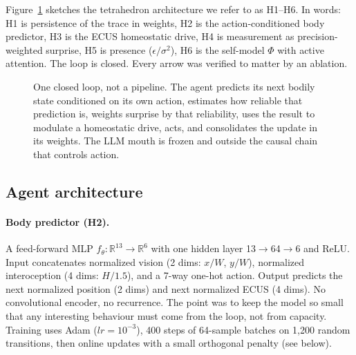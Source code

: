 \documentclass[11pt,a4paper]{article}
\begin{document}
Figure~\ref{fig:tetra} sketches the tetrahedron architecture we refer to as H1--H6. In words: H1 is persistence of the trace in weights, H2 is the action-conditioned body predictor, H3 is the ECUS homeostatic drive, H4 is measurement as precision-weighted surprise, H5 is presence ($\epsilon/\sigma^2$), H6 is the self-model $\Phi$ with active attention. The loop is closed. Every arrow was verified to matter by an ablation.

\begin{figure}[h]
\centering
{}
\caption{One closed loop, not a pipeline. The agent predicts its next bodily state conditioned on its own action, estimates how reliable that prediction is, weights surprise by that reliability, uses the result to modulate a homeostatic drive, acts, and consolidates the update in its weights. The LLM mouth is frozen and outside the causal chain that controls action.}
\label{fig:tetra}
\end{figure}

\subsection{Agent architecture}

\paragraph{Body predictor (H2).} A feed-forward MLP $f_\theta: \mathbb{R}^{13} \rightarrow \mathbb{R}^{6}$ with one hidden layer 13$\rightarrow$64$\rightarrow$6 and ReLU. Input concatenates normalized vision (2 dims: $x/W$, $y/W$), normalized interoception (4 dims: $H/1.5$), and a 7-way one-hot action. Output predicts the next normalized position (2 dims) and next normalized ECUS (4 dims). No convolutional encoder, no recurrence. The point was to keep the model so small that any interesting behaviour must come from the loop, not from capacity. Training uses Adam ($lr=10^{-3}$), 400 steps of 64-sample batches on 1,200 random transitions, then online updates with a small orthogonal penalty (see below).
\end{document}
